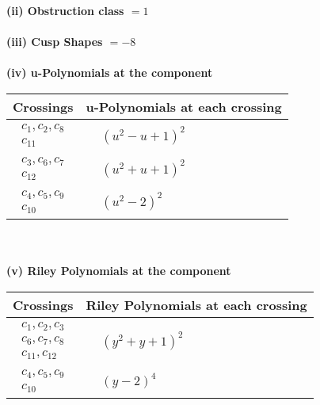 \documentclass[1p]{elsarticle_modified}
\theoremstyle{definition}
\begin{document}
\flushleft \textbf{(ii) Obstruction class $= 1$}\\~\\
\flushleft \textbf{(iii) Cusp Shapes $= -8$}\\~\\
\newpage\renewcommand{\arraystretch}{1}
\flushleft \textbf{(iv) u-Polynomials at the component}\newline \\
\begin{tabular}{m{50pt}|m{274pt}}
Crossings & \hspace{64pt}u-Polynomials at each crossing \\
\hline $$\begin{aligned}c_{1},c_{2},c_{8}\\c_{11}\end{aligned}$$&$\begin{aligned}
&(u^2- u+1)^2
\end{aligned}$\\
\hline $$\begin{aligned}c_{3},c_{6},c_{7}\\c_{12}\end{aligned}$$&$\begin{aligned}
&(u^2+u+1)^2
\end{aligned}$\\
\hline $$\begin{aligned}c_{4},c_{5},c_{9}\\c_{10}\end{aligned}$$&$\begin{aligned}
&(u^2-2)^2
\end{aligned}$\\
\hline
\end{tabular}\\~\\
\newpage\renewcommand{\arraystretch}{1}
\flushleft \textbf{(v) Riley Polynomials at the component}\newline \\
\begin{tabular}{m{50pt}|m{274pt}}
Crossings & \hspace{64pt}Riley Polynomials at each crossing \\
\hline $$\begin{aligned}c_{1},c_{2},c_{3}\\c_{6},c_{7},c_{8}\\c_{11},c_{12}\end{aligned}$$&$\begin{aligned}
&(y^2+y+1)^2
\end{aligned}$\\
\hline $$\begin{aligned}c_{4},c_{5},c_{9}\\c_{10}\end{aligned}$$&$\begin{aligned}
&(y-2)^4
\end{aligned}$\\
\hline
\end{tabular}\\~\\
\end{document}
